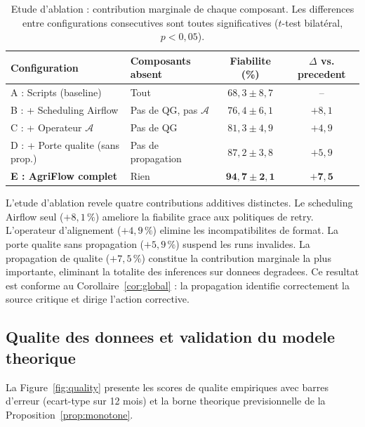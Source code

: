 \documentclass[12pt,a4paper]{article}
\theoremstyle{plain}
\theoremstyle{definition}
\theoremstyle{remark}
\begin{document}
\begin{table}[H]
\caption{Etude d'ablation : contribution marginale de chaque composant.
         Les differences entre configurations consecutives sont toutes
         significatives ($t$-test bilatéral, $p<0{,}05$).}
\label{tab:ablation}
\centering\small
\renewcommand{\arraystretch}{1.38}
\begin{tabularx}{\linewidth}{llcc}
\toprule
\textbf{Configuration} & \textbf{Composants absent} &
\textbf{Fiabilite (\%)} & \textbf{$\Delta$ vs. precedent} \\
\midrule
\rowcolor{lightblue!30}
A : Scripts (baseline)         & Tout             & $68{,}3\pm8{,}7$ & -- \\
B : + Scheduling Airflow       & Pas de QG, pas $\mathcal{A}$ & $76{,}4\pm6{,}1$ & $+8{,}1$ \\
\rowcolor{lightblue!30}
C : + Operateur $\mathcal{A}$  & Pas de QG        & $81{,}3\pm4{,}9$ & $+4{,}9$ \\
D : + Porte qualite (sans prop.)& Pas de propagation & $87{,}2\pm3{,}8$ & $+5{,}9$ \\
\rowcolor{lightblue!30}
\textbf{E : AgriFlow complet}  & Rien             & $\mathbf{94{,}7\pm2{,}1}$ & $\mathbf{+7{,}5}$ \\
\bottomrule
\end{tabularx}
\end{table}

L'etude d'ablation revele quatre contributions additives distinctes.
Le scheduling Airflow seul ($+8{,}1\,\%$) ameliore la fiabilite grace
aux politiques de retry. L'operateur d'alignement ($+4{,}9\,\%$) elimine
les incompatibilites de format. La porte qualite sans propagation
($+5{,}9\,\%$) suspend les runs invalides. La propagation de qualite
($+7{,}5\,\%$) constitue la contribution marginale la plus importante,
eliminant la totalite des inferences sur donnees degradees.
Ce resultat est conforme au Corollaire~\ref{cor:global} : la propagation
identifie correctement la source critique et dirige l'action corrective.

\subsection{Qualite des donnees et validation du modele theorique}

La Figure~\ref{fig:quality} presente les scores de qualite empiriques
avec barres d'erreur (ecart-type sur 12 mois) et la borne theorique
previsionnelle de la Proposition~\ref{prop:monotone}.
\end{document}
